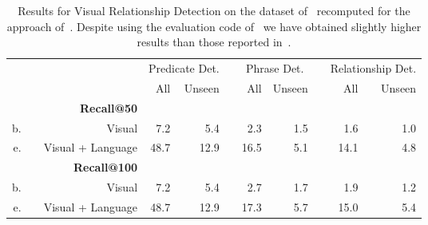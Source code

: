 \documentclass[10pt,twocolumn,letterpaper]{article}
\newcommand{\ra}[1]{\renewcommand{\arraystretch}{#1}}
\begin{document}
\begin{table*}\centering
\ra{1}
\begin{tabular}{@{}rrrrrcrrcrr@{}}\toprule
&& & \multicolumn{2}{c}{Predicate Det.} & \phantom{abc} & \multicolumn{2}{c}{Phrase Det.} & \phantom{abc}& \multicolumn{2}{c}{Relationship Det.}\\
&&								& All & Unseen && All & Unseen && All & Unseen \\\midrule
&& \textbf{Recall@50}\\
b. && Visual \cite{Lu16} 				&  7.2	& 5.4	&& 2.3 	& 1.5	&&  1.6	 & 1.0 \\
e. && Visual + Language \cite{Lu16} 		&  48.7 	& 12.9	&& 16.5 	& 5.1	&&  14.1 & 4.8 	\\
\rule{0pt}{3ex}  
 && \textbf{Recall@100}\\
b. && Visual \cite{Lu16} 				&  7.2	& 5.4	&& 2.7 	& 1.7	&&  1.9	 & 1.2 \\
e. && Visual + Language \cite{Lu16} 		&  48.7 	& 12.9	&& 17.3 	& 5.7	&&  15.0 & 5.4 	\\
\bottomrule
\end{tabular}
\caption{Results for Visual Relationship Detection on the dataset of~\cite{Lu16} recomputed for the approach of~\cite{Lu16}. Despite using the evaluation code of~\cite{Lu16} we have obtained slightly higher results than those reported in~\cite{Lu16}.} 
\vspace{-.1cm}
\label{tab:baseline_lu}
\end{table*}
\end{document}
